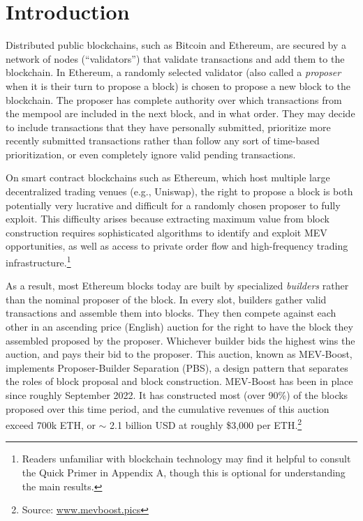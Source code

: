 \documentclass[12pt,reqno]{amsart}
\begin{document}

\hypersetup{pageanchor=false}
\maketitle

\thispagestyle{empty}

\newpage

\hypersetup{pageanchor=true}
\section{Introduction} \label{sec:intro}
Distributed public blockchains, such as Bitcoin and Ethereum, are secured by a network of nodes (``validators'') that validate transactions and add them to the blockchain. In Ethereum, a randomly selected validator (also called a \textit{proposer} when it is their turn to propose a block) is chosen to propose a new block to the blockchain. The proposer has complete authority over which transactions from the mempool are included in the next block, and in what order. They may decide to include transactions that they have personally submitted, prioritize more recently submitted transactions rather than follow any sort of time-based prioritization, or even completely ignore valid pending transactions. 

On smart contract blockchains such as Ethereum, which host multiple large decentralized trading venues (e.g., Uniswap), the right to propose a block is both potentially very lucrative and difficult for a randomly chosen proposer to fully exploit. This difficulty arises because extracting maximum value from block construction requires sophisticated algorithms to identify and exploit MEV opportunities, as well as access to private order flow and high-frequency trading infrastructure.\footnote{Readers unfamiliar with blockchain technology may find it helpful to consult the Quick Primer in Appendix A, though this is optional for understanding the main results.} 


As a result, most Ethereum blocks today are built by specialized \textit{builders} rather than the nominal proposer of the block. In every slot, builders gather valid transactions and assemble them into blocks. They then compete against each other in an ascending price (English) auction for the right to have the block they assembled proposed by the proposer. Whichever builder bids the highest wins the auction, and pays their bid to the proposer. This auction, known as MEV-Boost, implements Proposer-Builder Separation (PBS), a design pattern that separates the roles of block proposal and block construction. MEV-Boost has been in place since roughly September 2022. It has constructed most (over 90\%) of the blocks proposed over this time period, and the cumulative revenues of this auction exceed 700k ETH, or $\sim$ 2.1 billion USD at roughly \$3,000 per ETH.\footnote{Source: \url{www.mevboost.pics}} 
\end{document}
